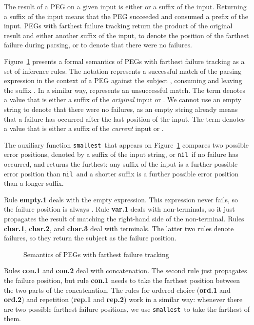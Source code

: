 \documentclass[3p,12pt,singlecolumn]{elsarticle}
\newcommand{\Suf}{{\tt smallest}}
\newcommand{\Nil}{{\tt nil}}
\begin{document}
The result of a PEG on a given input is either
 or a suffix of the input. Returning a suffix of the
input means that the PEG succeeded and consumed a prefix
of the input. PEGs with farthest failure tracking return
the product of the original result and either another
suffix of the input, to denote the position of the farthest
failure during parsing, or  to denote that 
there were no failures. 

Figure~\ref{fig:semfarthest} presents a formal semantics of
PEGs with farthest failure tracking as a set of inference rules.
The notation  represents
a successful match of the parsing expression  in the context of
a PEG  against the subject , consuming  and leaving the
suffix .
In a similar way, 
represents an unsuccessful match. The term  denotes
a value that is either a suffix  of the {\em original} input or
. We cannot use an empty string to denote that there were no failures,
as an empty string already means that a failure has occurred after
the last position of the input.
The term  denotes a value that is either a suffix of the
{\em current} input or .

The auxiliary function \Suf\ that appears on
Figure~\ref{fig:semfarthest} compares two possible
error positions, denoted by a suffix of the
input string, or \Nil\, if no failure has occurred,
and returns the furthest: any suffix of the input
is a further possible error position than \Nil\,
and a shorter suffix is a further possible
error position than a longer suffix.

Rule {\bf empty.1} deals with the empty expression. This
expression never fails, so the failure position is always
. Rule {\bf var.1} deals with
non-terminals, so it just propagates the result of
matching the right-hand side of the non-terminal.
Rules {\bf char.1}, {\bf char.2}, and {\bf char.3} deal with
terminals. The latter two rules denote failures, so they
return the subject as the failure position.

\begin{figure}[t]
	{\small
		
	}
	\caption{Semantics of PEGs with farthest failure tracking}
	\label{fig:semfarthest}
\end{figure}

Rules {\bf con.1} and {\bf con.2} deal with concatenation.
The second rule just propagates the failure position, but
rule {\bf con.1} needs to take the farthest position
between the two parts of the concatenation. The rules
for ordered choice ({\bf ord.1} and {\bf ord.2}) and
repetition ({\bf rep.1} and {\bf rep.2}) work in
a similar way: whenever there are two possible farthest
failure positions, we use \Suf\ to take the farthest of
them.
\end{document}
